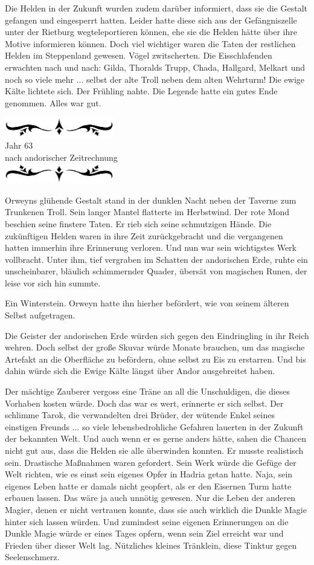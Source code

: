 \documentclass[10pt, a4paper, oneside]{book}
\newcommand{\az}[1]{%
    \begin{center}
        \includegraphics[width=180px]{Das Erbe des Wunderkindes/verzierung1.png}\\
        {\Huge #1} \\
        {nach andorischer Zeitrechnung}\\
        \includegraphics[width=180px]{Das Erbe des Wunderkindes/verzierung2.png}
    \end{center}
    \extramarks{}{#1 a.Z.}
}
\begin{document}
Die Helden in der Zukunft wurden zudem darüber informiert, dass sie die Gestalt gefangen und eingesperrt hatten. Leider hatte diese sich aus der Gefängniszelle unter der Rietburg wegteleportieren können, ehe sie die Helden hätte über ihre Motive informieren können. Doch viel wichtiger waren die Taten der restlichen Helden im Steppenland gewesen. Vögel zwitscherten. Die Eisschlafenden erwachten nach und nach: Gilda, Thoralds Trupp, Chada, Hallgard, Melkart und noch so viele mehr ... selbst der alte Troll neben dem alten Wehrturm! Die ewige Kälte lichtete sich. Der Frühling nahte. Die Legende hatte ein gutes Ende genommen. Alles war gut. 

\az{Jahr 63}

Orweyns glühende Gestalt stand in der dunklen Nacht neben der Taverne zum Trunkenen Troll. Sein langer Mantel flatterte im Herbstwind. Der rote Mond beschien seine finstere Taten. Er rieb sich seine schmutzigen Hände. Die zukünftigen Helden waren in ihre Zeit zurückgebracht und die vergangenen hatten immerhin ihre Erinnerung verloren. Und nun war sein wichtigstes Werk vollbracht. Unter ihm, tief vergraben im Schatten der andorischen Erde, ruhte ein unscheinbarer, bläulich schimmernder Quader, übersät von magischen Runen, der leise vor sich hin summte. 

Ein Winterstein. Orweyn hatte ihn hierher befördert, wie von seinem älteren Selbst aufgetragen.

Die Geister der andorischen Erde würden sich gegen den Eindringling in ihr Reich wehren. Doch selbst der große Skuvar würde Monate brauchen, um das magische Artefakt an die Oberfläche zu befördern, ohne selbst zu Eis zu erstarren. Und bis dahin würde sich die Ewige Kälte längst über Andor ausgebreitet haben. 

Der mächtige Zauberer vergoss eine Träne an all die Unschuldigen, die dieses Vorhaben kosten würde. Doch das war es wert, erinnerte er sich selbst. Der schlimme Tarok, die verwandelten drei Brüder, der wütende Enkel seines einstigen Freunds ... so viele lebensbedrohliche Gefahren lauerten in der Zukunft der bekannten Welt. Und auch wenn er es gerne anders hätte, sahen die Chancen nicht gut aus, dass die Helden sie alle überwinden konnten. Er musste realistisch sein. Drastische Maßnahmen waren gefordert. Sein Werk würde die Gefüge der Welt richten, wie es einst sein eigenes Opfer in Hadria getan hatte. Naja, sein eigenes Leben hatte er damals nicht geopfert, als er den Eisernen Turm hatte erbauen lassen. Das wäre ja auch unnötig gewesen. Nur die Leben der anderen Magier, denen er nicht vertrauen konnte, dass sie auch wirklich die Dunkle Magie hinter sich lassen würden. Und zumindest seine eigenen Erinnerungen an die Dunkle Magie würde er eines Tages opfern, wenn sein Ziel erreicht war und Frieden über dieser Welt lag. Nützliches kleines Tränklein, diese Tinktur gegen Seelenschmerz. 
\end{document}
